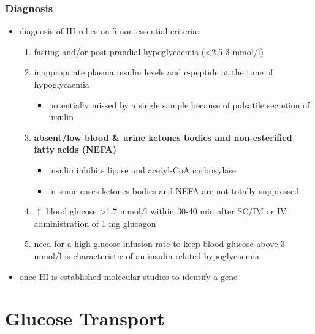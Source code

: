 \documentclass[12pt]{scrartcl}
\begin{document}
\subsubsection{Diagnosis}
\label{sec:org534729e}
\begin{itemize}
\item diagnosis of HI relies on 5 non-essential criteria:
\begin{enumerate}
\item fasting and/or post-prandial hypoglycaemia (\textless{}2.5-3 mmol/l)
\item inappropriate plasma insulin levels and c-peptide at the time of
hypoglycaemia
\begin{itemize}
\item potentially missed by a single sample because of pulsatile
secretion of insulin
\end{itemize}
\item \textbf{absent/low blood \& urine ketones bodies and non-esterified fatty}
\textbf{acids (NEFA)}
\begin{itemize}
\item insulin inhibits lipase and acetyl-CoA carboxylase
\item in some cases ketones bodies and NEFA are not totally
suppressed
\end{itemize}
\item \(\uparrow\) blood glucose \textgreater{}1.7 mmol/l within 30-40 min after
SC/IM or IV administration of 1 mg glucagon
\item need for a high glucose infusion rate to keep blood
glucose above 3 mmol/l is characteristic of an insulin related
hypoglycaemia
\end{enumerate}
\item once HI is established molecular studies to identify a gene
\end{itemize}
\section{Glucose Transport}
\label{sec:org821e0e9}
\end{document}

